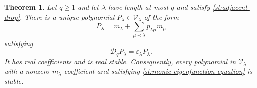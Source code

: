 \documentclass[10pt,a4paper]{amsart}
\newtheorem{theorem}{Theorem}
\begin{document}
\begin{theorem}\label{st:stable-eigenfunction}
Let $q\geq1$ and let $\lambda$ have length at most $q$ and satisfy
\eqref{st:adjacent-drop}.  There is a unique polynomial
$P_\lambda\in\mathcal V_\lambda$ of the form
\begin{equation}\label{st:monic-eigenfunction-form}
P_\lambda=m_\lambda+\sum_{\mu\prec\lambda}p_{\lambda\mu}m_\mu
\end{equation}
satisfying
\begin{equation}\label{st:monic-eigenfunction-equation}
\mathcal D_qP_\lambda=\varepsilon_\lambda P_\lambda.
\end{equation}
It has real coefficients and is real stable.  Consequently, every
polynomial in $\mathcal V_\lambda$ with a nonzero $m_\lambda$
coefficient and satisfying \eqref{st:monic-eigenfunction-equation}
is stable.
\end{theorem}
\end{document}
